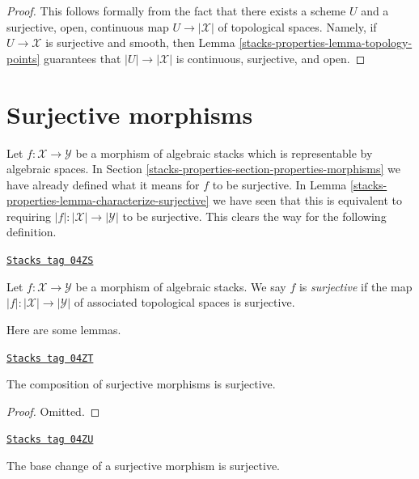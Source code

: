 \begin{proof}
This follows formally from the fact that there exists a scheme
$U$ and a surjective, open, continuous map $U \to |\mathcal{X}|$
of topological spaces. Namely, if $U \to \mathcal{X}$ is surjective and
smooth, then
Lemma \ref{stacks-properties-lemma-topology-points}
guarantees that $|U| \to |\mathcal{X}|$ is continuous, surjective, and open.
\end{proof}

\section{Surjective morphisms}
\label{stacks-properties-section-surjective}
Let $f : \mathcal{X} \to \mathcal{Y}$ be a morphism of algebraic stacks
which is representable by algebraic spaces. In
Section \ref{stacks-properties-section-properties-morphisms}
we have already defined what it means for $f$ to be surjective. In
Lemma \ref{stacks-properties-lemma-characterize-surjective}
we have seen that this is equivalent to requiring
$|f| : |\mathcal{X}| \to |\mathcal{Y}|$ to be surjective.
This clears the way for the following definition.

\begin{definition}[Surjective]
\label{stacks-properties-definition-surjective}
\href{https://stacks.math.columbia.edu/tag/04ZS}{\texttt{Stacks tag 04ZS}}

Let $f : \mathcal{X} \to \mathcal{Y}$ be a morphism of algebraic stacks.
We say $f$ is {\it surjective} if the map
$|f| : |\mathcal{X}| \to |\mathcal{Y}|$ of associated topological spaces
is surjective.
\end{definition}

Here are some lemmas.

\begin{lemma}
\label{stacks-properties-lemma-composition-surjective}
\href{https://stacks.math.columbia.edu/tag/04ZT}{\texttt{Stacks tag 04ZT}}

The composition of surjective morphisms is surjective.
\end{lemma}

\begin{proof}
Omitted.
\end{proof}

\begin{lemma}
\label{stacks-properties-lemma-base-change-surjective}
\href{https://stacks.math.columbia.edu/tag/04ZU}{\texttt{Stacks tag 04ZU}}

The base change of a surjective morphism is surjective.
\end{lemma}

